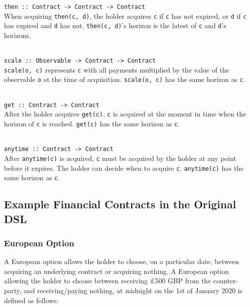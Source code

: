 \parbox{\textwidth}{
\texttt{then :: Contract -> Contract -> Contract} \\

When acquiring \texttt{then(c, d)}, the holder acquires \texttt{c} if \texttt{c} has not expired, or \texttt{d} if \texttt{c} has expired and \texttt{d} has not. \texttt{then(c, d)}'s horizon is the latest of \texttt{c} and \texttt{d}'s horizons. \\ \\
}

\parbox{\textwidth}{
\texttt{scale :: Observable -> Contract -> Contract} \\

\texttt{scale(o, c)} represents \texttt{c} with all payments multiplied by the value of the observable \texttt{o} at the time of acquisition. \texttt{scale(o, c)} has the same horizon as \texttt{c}. \\ \\
}

\parbox{\textwidth}{
\texttt{get :: Contract -> Contract} \\

After the holder acquires \texttt{get(c)}, \texttt{c} is acquired at the moment in time when the horizon of \texttt{c} is reached. \texttt{get(c)} has the same horizon as \texttt{c}. \\ \\
}

\parbox{\textwidth}{
\texttt{anytime :: Contract -> Contract} \\

After \texttt{anytime(c)} is acquired, \texttt{c} must be acquired by the holder at any point before it expires. The holder can decide when to acquire \texttt{c}. \texttt{anytime(c)} has the same horizon as \texttt{c}.
}


\subsection{Example Financial Contracts in the Original DSL} \label{example-contracts}

\subsubsection{European Option}

A European option allows the holder to choose, on a particular date, between acquiring an underlying contract or acquiring nothing. A European option allowing the holder to choose between receiving £500 GBP from the counter-party, and receiving/paying nothing, at midnight on the 1st of January 2020 is defined as follows:

